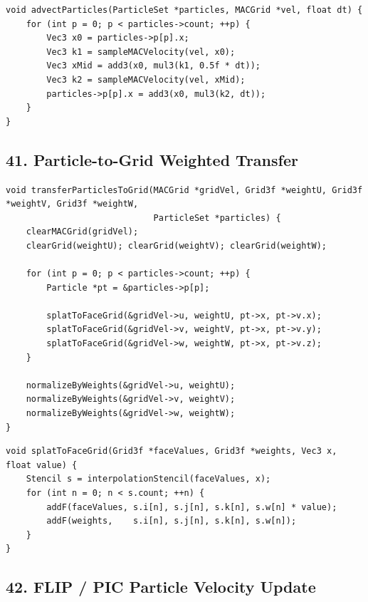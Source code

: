 \documentclass[10pt,letterpaper]{article}
\begin{document}
\begin{verbatim}
void advectParticles(ParticleSet *particles, MACGrid *vel, float dt) {
    for (int p = 0; p < particles->count; ++p) {
        Vec3 x0 = particles->p[p].x;
        Vec3 k1 = sampleMACVelocity(vel, x0);
        Vec3 xMid = add3(x0, mul3(k1, 0.5f * dt));
        Vec3 k2 = sampleMACVelocity(vel, xMid);
        particles->p[p].x = add3(x0, mul3(k2, dt));
    }
}
\end{verbatim}

\subsection*{41. Particle-to-Grid Weighted Transfer}

\begin{verbatim}
void transferParticlesToGrid(MACGrid *gridVel, Grid3f *weightU, Grid3f *weightV, Grid3f *weightW,
                             ParticleSet *particles) {
    clearMACGrid(gridVel);
    clearGrid(weightU); clearGrid(weightV); clearGrid(weightW);

    for (int p = 0; p < particles->count; ++p) {
        Particle *pt = &particles->p[p];

        splatToFaceGrid(&gridVel->u, weightU, pt->x, pt->v.x);
        splatToFaceGrid(&gridVel->v, weightV, pt->x, pt->v.y);
        splatToFaceGrid(&gridVel->w, weightW, pt->x, pt->v.z);
    }

    normalizeByWeights(&gridVel->u, weightU);
    normalizeByWeights(&gridVel->v, weightV);
    normalizeByWeights(&gridVel->w, weightW);
}
\end{verbatim}

\begin{verbatim}
void splatToFaceGrid(Grid3f *faceValues, Grid3f *weights, Vec3 x, float value) {
    Stencil s = interpolationStencil(faceValues, x);
    for (int n = 0; n < s.count; ++n) {
        addF(faceValues, s.i[n], s.j[n], s.k[n], s.w[n] * value);
        addF(weights,    s.i[n], s.j[n], s.k[n], s.w[n]);
    }
}
\end{verbatim}

\subsection*{42. FLIP / PIC Particle Velocity Update}
\end{document}
